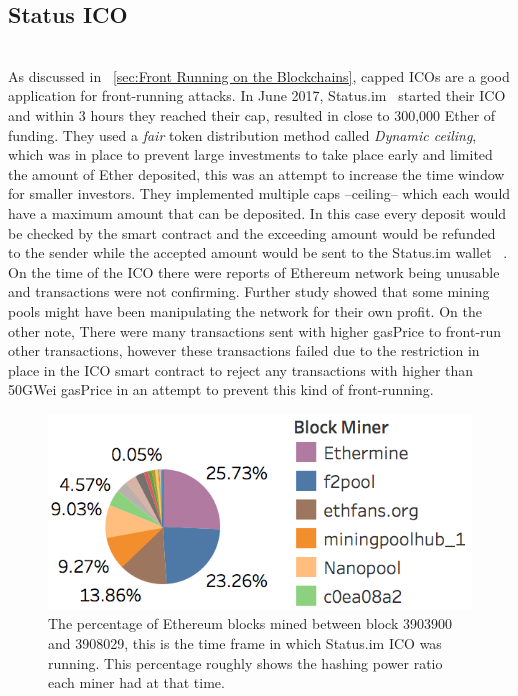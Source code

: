 \subsection{Status ICO} \hfill\\ 
\noindent As discussed in ~\ref{sec:Front Running on the Blockchains}, capped ICOs are a good application for front-running attacks.  In June 2017, Status.im~\cite{statuswhitepaper} started their ICO and within 3 hours they reached their cap, resulted in close to 300,000 Ether of funding. They used a \textit{fair} token distribution method called \textit{Dynamic ceiling}, which was in place to prevent large investments to take place early and limited the amount of Ether deposited, this was an attempt to increase the time window for smaller investors. They implemented multiple caps --ceiling-- which each would have a maximum amount that can be deposited. In this case every deposit would be checked by the smart contract and the exceeding amount would be refunded to the sender while the accepted amount would be sent to the Status.im wallet ~\cite{statusicoanalysis}. 
On the time of the ICO there were reports of Ethereum network being unusable and transactions were not confirming. Further study showed that some mining pools might have been manipulating the network for their own profit. On the other note, There were many transactions sent with higher gasPrice to front-run other transactions, however these transactions failed due to the restriction in place in the ICO smart contract to reject any transactions with higher than 50GWei gasPrice in an attempt to prevent this kind of front-running.


\begin{figure}[h]
\centering
\includegraphics[width=0.5\linewidth]{figures/Mining_pool_ratio.png}
\caption{The percentage of Ethereum blocks mined between block 3903900 and 3908029, this is the time frame in which Status.im ICO was running. This percentage roughly shows the hashing power ratio each miner had at that time. \label{fig:mining_pool_ratio}} %
\end{figure}

